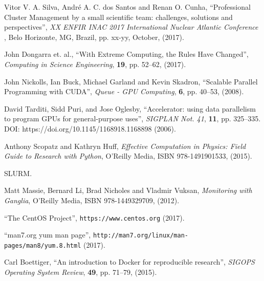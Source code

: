 \documentclass[twoside,a4paper,12pt,english]{inac19}
\begin{document}

\begin{thebibliography}{99} %

 Vitor V. A. Silva, Andr\'{e} A. C. dos Santos and Renan O. Cunha, ``Professional Cluster Management
  by a small scientific team: challenges, solutions and perspectives'', \textit{XX ENFIR INAC 2017 International Nuclear Atlantic Conference }, Belo Horizonte, MG, Brazil, pp. xx-yy, October, (2017). 
  
  
 John Dongarra et. al., ``With Extreme Computing, the Rules Have Changed'', \textit{Computing in Science Engineering}, \textbf{19}, pp. 52--62, (2017).
  
 John Nickolls, Ian Buck, Michael Garland and Kevin Skadron, ``Scalable Parallel Programming with CUDA'', \textit{Queue - GPU Computing}, \textbf{6}, pp. 40--53, (2008).
  
 David Tarditi, Sidd Puri, and Jose Oglesby, ``Accelerator: using data parallelism to program GPUs for general-purpose uses'',  \textit{SIGPLAN Not. 41}, \textbf{11}, pp. 325--335. DOI: https://doi.org/10.1145/1168918.1168898 (2006).

 Anthony Scopatz and Kathryn Huff, \textit{Effective Computation in Physics: Field Guide to Research with Python}, O'Reilly Media, ISBN 978-1491901533, (2015).
  
 SLURM.
  

 Matt Massie, Bernard Li, Brad Nicholes and Vladmir Vuksan, \textit{Monitoring with Ganglia}, O'Reilly Media, ISBN 978-1449329709, (2012).

 ``The CentOS Project'', \verb#https://www.centos.org# (2017).

 ``man7.org yum man page'', \verb#http://man7.org/linux/man-pages/man8/yum.8.html# (2017).
  
 Carl Boettiger, ``An introduction to Docker for reproducible research'', \textit{SIGOPS Operating System Review}, \textbf{49}, pp. 71--79, (2015).


\end{thebibliography}
\end{document}
